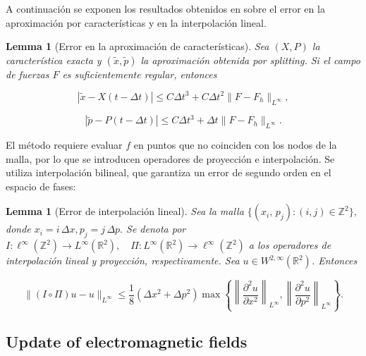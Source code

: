 \documentclass[11pt,a4paper,twoside,pdf]{article}
\numberwithin{equation}{section}
\newtheorem{lemma}[theorem]{Lemma}
\begin{document}
A continuación se exponen los resultados obtenidos en \cite{bostan2009convergence} sobre el error en la aproximación por características y en la interpolación lineal.

\begin{lemma}[Error en la aproximación de características]
Sea $(X,P)$ la característica exacta y $(\tilde{x},\tilde{p})$ la aproximación obtenida por
splitting. Si el campo de fuerzas $F$ es suficientemente regular, entonces


\[
|\tilde{x}-X(t-\Delta t)| \le C\Delta t^3 + C\Delta t^2\|F-F_h\|_{L^\infty},
\]




\[
|\tilde{p}-P(t-\Delta t)| \le C\Delta t^3 + \Delta t\|F-F_h\|_{L^\infty}.
\]


\end{lemma}






El método requiere evaluar $f$ en puntos que no coinciden con los nodos de la
malla, por lo que se introducen operadores de proyección e interpolación. Se utiliza
interpolación bilineal, que garantiza un error de segundo orden en el espacio de
fases:

\begin{lemma}[Error de interpolación lineal]

Sea la malla $\{(x_i,\, p_j) : (i,j)\in \mathbb{Z}^2\},$ donde $x_i = i\,\Delta x, p_j = j\,\Delta p.$ Se denota por $I : \ell^\infty(\mathbb{Z}^2) \longrightarrow L^\infty(\mathbb{R}^2), 
\quad 
\Pi : L^\infty(\mathbb{R}^2) \longrightarrow \ell^\infty(\mathbb{Z}^2)$ a los operadores de interpolación lineal y proyección, respectivamente. Sea $u\in W^{2,\infty}(\mathbb{R}^2)$. Entonces


\[
\|(I\circ\Pi)u - u\|_{L^\infty}
\le \frac{1}{8}(\Delta x^2 + \Delta p^2)
\max\left\{
\left\|\frac{\partial^2 u}{\partial x^2}\right\|_{L^\infty},
\left\|\frac{\partial^2 u}{\partial p^2}\right\|_{L^\infty}
\right\}.
\]



\end{lemma}





\subsection{Update of electromagnetic fields}
\end{document}
